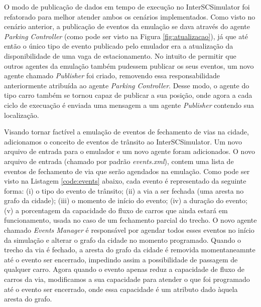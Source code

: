 O modo de publicação de dados em tempo de execução no InterSCSimulator foi refatorado para melhor atender ambos os cenários implementados.
Como visto no cenário anterior, a publicação de eventos da emulação se dava através do agente \textit{Parking Controller} (como pode ser visto na Figura \ref{fig:atualizacao}), já que
até então o único tipo de evento publicado pelo emulador era a atualização da disponibilidade de uma vaga de estacionamento.
No intuito de permitir que outros agentes da emulação também pudessem publicar os seus eventos, um novo agente chamado \textit{Publisher} foi criado, removendo essa responsabilidade
anteriormente atribuída ao agente \textit{Parking Controller}.
Desse modo, o agente do tipo carro também se tornou capaz de publicar a sua posição, onde agora a cada ciclo de execuação é enviada uma mensagem a um agente \textit{Publisher}
contendo sua localização.

Visando tornar factível a emulação de eventos de fechamento de vias na cidade, adicionamos o conceito de eventos de trânsito ao InterSCSimulator.
Um novo arquivo de entrada para o emulador e um novo agente foram adicionados.
O novo arquivo de entrada (chamado por padrão \textit{events.xml}), contem uma lista de eventos de fechamento de via que serão agendados na emulação.
Como pode ser visto na Listagem \ref{code:events} abaixo, cada evento é representado da seguinte forma:
(i) o tipo do evento de trânsito;
(ii) a via a ser fechada (uma aresta no grafo da cidade);
(iii) o momento de início do evento;
(iv) a duração do evento;
(v) a porcentagem da capacidade do fluxo de carros que ainda estará em funcionamento, usada no caso de um fechamento parcial do trecho.
O novo agente chamado \textit{Events Manager} é responsável por agendar todos esses eventos no início da simulação e alterar o grafo da cidade no momento programado.
Quando o trecho da via é fechado, a aresta do grafo da cidade é removida momentaneamnte até o evento ser encerrado, impedindo assim a possibilidade de passagem de qualquer
carro.
Agora quando o evento apenas reduz a capacidade de fluxo de carros da via, modificamos a sua capacidade para atender o que foi programado até o evento ser encerrado,
onde essa capacidade é um atributo dado àquela aresta do grafo.

    

